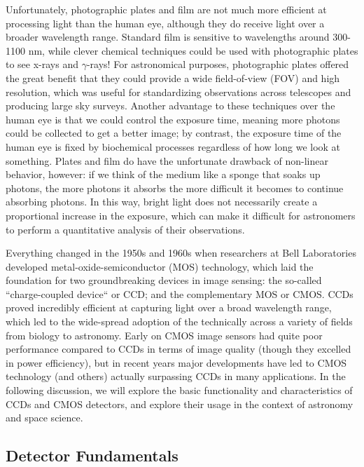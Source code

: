 \documentclass{tufte-book}
\newcommand{\gmray}{\ensuremath{\gamma}-ray}
\begin{document}
Unfortunately, photographic plates and film are not much more efficient at processing light than the human eye, although they do receive light over a broader wavelength range. Standard film is sensitive to wavelengths around 300-1100 nm, while clever chemical techniques could be used with photographic plates to see x-rays and \gmray s! For astronomical purposes, photographic plates offered the great benefit that they could provide a wide field-of-view (FOV) and high resolution, which was useful for standardizing observations across telescopes and producing large sky surveys. Another advantage to these techniques over the human eye is that we could control the exposure time, meaning more photons could be collected to get a better image; by contrast, the exposure time of the human eye is fixed by biochemical processes regardless of how long we look at something. Plates and film do have the unfortunate drawback of non-linear behavior, however: if we think of the medium like a sponge that soaks up photons, the more photons it absorbs the more difficult it becomes to continue absorbing photons. In this way, bright light does not necessarily create a proportional increase in the exposure, which can make it difficult for astronomers to perform a quantitative analysis of their observations.

Everything changed in the 1950s and 1960s when researchers at Bell Laboratories developed metal-oxide-semiconductor (MOS) technology, which laid the foundation for two groundbreaking devices in image sensing: the so-called ``charge-coupled device`` or CCD; and the complementary MOS or CMOS. CCDs proved incredibly efficient at capturing light over a broad wavelength range, which led to the wide-spread adoption of the technically across a variety of fields from biology to astronomy. Early on CMOS image sensors had quite poor performance compared to CCDs in terms of image quality (though they excelled in power efficiency), but in recent years major developments have led to CMOS technology (and others) actually surpassing CCDs in many applications. In the following discussion, we will explore the basic functionality and characteristics of CCDs and CMOS detectors, and explore their usage in the context of astronomy and space science.

\subsection{Detector Fundamentals}
\label{subsec:det_fund}
\end{document}
